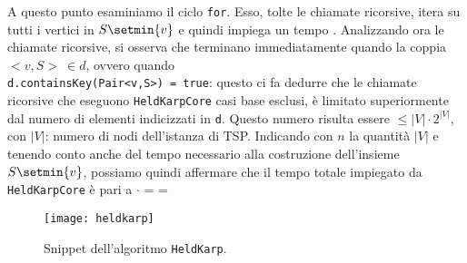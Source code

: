 A questo punto esaminiamo il ciclo \texttt{for}. Esso, tolte le chiamate ricorsive, itera su tutti i vertici in $S\setmin \{v\}$ e quindi impiega un tempo . Analizzando ora le chiamate ricorsive, si osserva che terminano immediatamente quando la coppia $<\!\!v, S\!\!>\ \in d$, ovvero quando\\ \texttt{d.containsKey(Pair<v,S>) = true}: questo ci fa dedurre che le chiamate ricorsive che eseguono \texttt{HeldKarpCore} casi base esclusi, è limitato superiormente dal numero di elementi indicizzati in \texttt{d}. Questo numero risulta essere $\leq |V|\cdot 2^{|V|}$, con $|V|$: numero di nodi dell'istanza di TSP.\eqcapo
Indicando con $n$ la quantità $|V|$ e tenendo conto anche del tempo necessario alla costruzione dell'insieme $S\setmin \{v\}$, possiamo quindi affermare che il tempo totale impiegato da \texttt{HeldKarpCore} è pari a 
$\cdot$ =  = 
\begin{figure}[H]
	\texttt{[image: heldkarp]}
	\caption{Snippet dell'algoritmo \texttt{HeldKarp}.}
	\label{confronto}
\end{figure}

